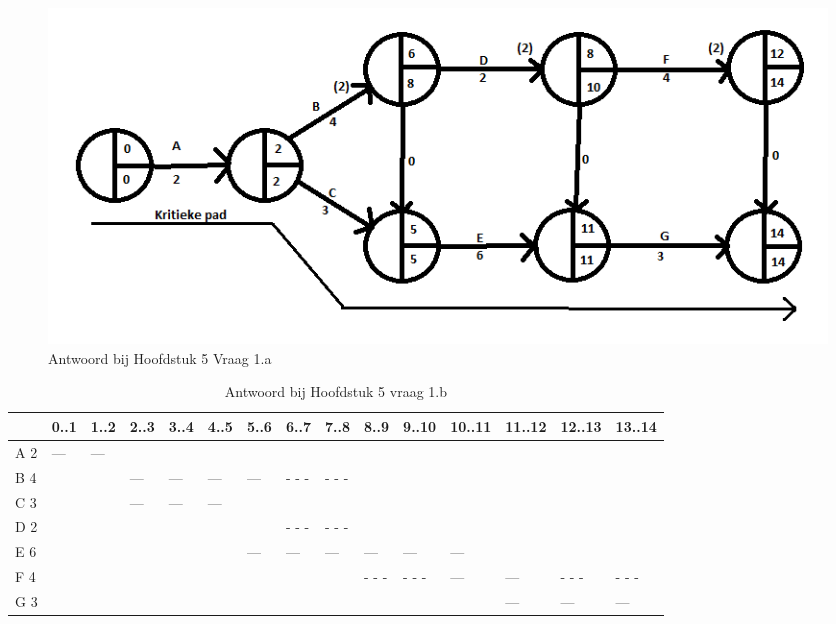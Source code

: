\documentclass[a4paper,titlepage]{artikel1}
\begin{document}
       \begin{figure}[tbh]
         \caption{Antwoord bij Hoofdstuk 5 Vraag 1.a} \label{r51a}
         \includegraphics[scale=0.75]{H5O1A.png}     
       \end{figure}
   \begin{table}
     \caption{Antwoord bij Hoofdstuk 5 vraag 1.b} \label{r51b}
       \begin{tabular}[htb]{|l|l|l|l|l|l|l|l|l|l|l|l|l|l|l|}
         \hline
             & 0..1 & 1..2 & 2..3 & 3..4 & 4..5 & 5..6 & 6..7 & 7..8 & 8..9 & 9..10 & 10..11 & 11..12 & 12..13 & 13..14 \\
         \hline
         A 2 &  --- &  --- &      &      &      &      &      &      &      &       &        &        &        &\\
         \hline
         B 4 &      &      &  --- & ---  & ---  & ---  & - - -& - - -&      &       &        &        &        &\\
         \hline
         C 3 &      &      &  --- & ---  & ---  &      &      &      &      &       &        &        &        &\\
         \hline
         D 2 &      &      &      &      &      &      & - - -& - - -&      &       &        &        &        &\\
         \hline
         E 6 &      &      &      &      &      & ---  & ---  & ---  & ---  & ---   & ---    &        &        &\\
         \hline     
         F 4 &      &      &      &      &      &      &      &      & - - -& - - - & ---    & ---    & - - -  & - - -\\
         \hline
         G 3 &      &      &      &      &      &      &      &      &      &       &        & ---    & ---    & ---\\
         \hline
       \end{tabular}
   \end{table}
   
\end{document}
